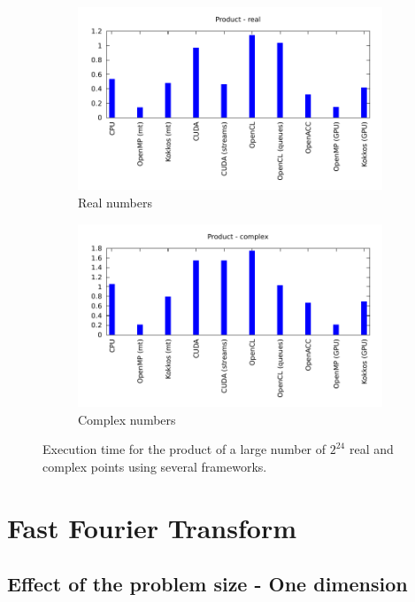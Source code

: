 \documentclass[12pt, a4paper]{article}
\begin{document}
\begin{figure}[H]
\captionsetup{width=0.8\linewidth}
\centering
\begin{subfigure}{.5\textwidth}
\centering
\includegraphics[width=.9\linewidth]{graphs/product-r.pdf}
\caption{Real numbers}
\label{PRODR}
\end{subfigure}%
\begin{subfigure}{.5\textwidth}
\centering
\includegraphics[width=.9\linewidth]{graphs/product-c.pdf}
\caption{Complex numbers}
\label{PRODC}
\end{subfigure}
\caption{Execution time for the product of a large number of $2^{24}$ real and complex points using several frameworks.}
\label{1DFFTW}
\end{figure}



\section{Fast Fourier Transform}
\subsection{Effect of the problem size - One dimension}
\end{document}
